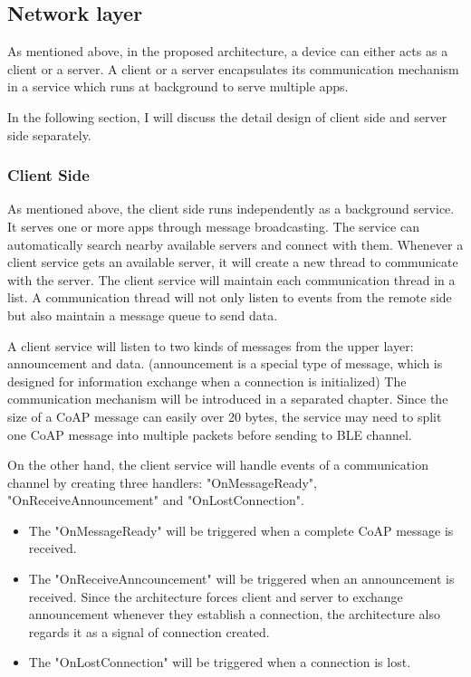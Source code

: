 \documentclass{Nan_Thesis}
\begin{document}
\subsection{Network layer}
As mentioned above, in the proposed architecture, a device can either acts as a client or a server. A client or a server encapsulates its communication mechanism in a service which runs at background to serve multiple apps. 

In the following section, I will discuss the detail design of client side and server side separately. 
\subsubsection{Client Side}
As mentioned above, the client side runs independently as a background service. It serves one or more apps through message broadcasting. The service can automatically search nearby available servers and connect with them. Whenever a client service gets an available server, it will create a new thread to communicate with the server. The client service will maintain each communication thread in a list. A communication thread will not only listen to events from the remote side but also maintain a message queue to send data. 

A client service will listen to two kinds of messages from the upper layer: announcement and data. (announcement is a special type of message, which is designed for information exchange when a connection is initialized) The communication mechanism will be introduced in a separated chapter. Since the size of a CoAP message can easily over 20 bytes, the service may need to split one CoAP message into multiple packets before sending to BLE channel. 

On the other hand, the client service will handle events of a communication channel by creating three handlers: "OnMessageReady", "OnReceiveAnnouncement" and "OnLostConnection". 

\begin{itemize}
  \item The "OnMessageReady" will be triggered when a complete CoAP message is received. 
  \item The "OnReceiveAnncouncement" will be triggered when an announcement is received. Since the architecture forces client and server to exchange announcement whenever they establish a connection, the architecture also regards it as a signal of connection created. 
  \item The "OnLostConnection" will be triggered when a connection is lost.   
\end{itemize}
\end{document}
